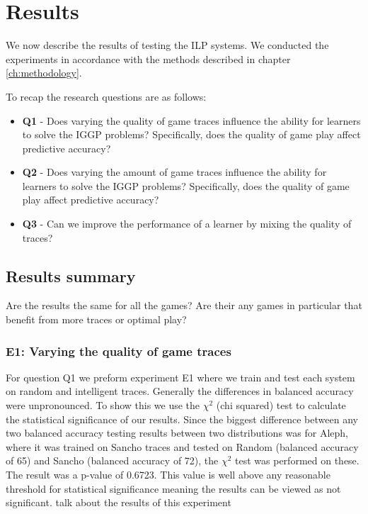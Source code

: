 \chapter{Results}\label{ch:results}
We now describe the results of testing the ILP systems. We conducted the experiments in accordance with the methods described in chapter \ref{ch:methodology}.

To recap the research questions are as follows:
\begin{itemize}
	\item \textbf{Q1} - Does varying the quality of game traces influence the ability for learners to solve the IGGP problems? Specifically, does the quality of game play affect predictive accuracy?
	\item \textbf{Q2} - Does varying the amount of game traces influence the ability for learners to solve the IGGP problems? Specifically, does the quality of game play affect predictive accuracy?
	\item \textbf{Q3} - Can we improve the performance of a learner by mixing the quality of traces?
\end{itemize}

\section{Results summary}
\ac{
	Are the results the same for all the games?
	Are their any games in particular that benefit from more traces or optimal play?
}

\subsection{E1: Varying the quality of game traces}
For question Q1 we preform experiment E1 where we train and test each system on random and intelligent traces. Generally the differences in balanced accuracy were unpronounced. To show this we use the $\chi^2$ (chi squared) test to calculate the statistical significance of our results. Since the biggest difference between any two balanced accuracy testing results between two distributions was for Aleph, where it was trained on Sancho traces and tested on Random (balanced accuracy of 65) and Sancho (balanced accuracy of 72), the $\chi^2$ test was performed on these. The result was a p-value of 0.6723. This value is well above any reasonable threshold for statistical significance meaning the results can be viewed as not significant. 
\ac{talk about the results of this experiment}



